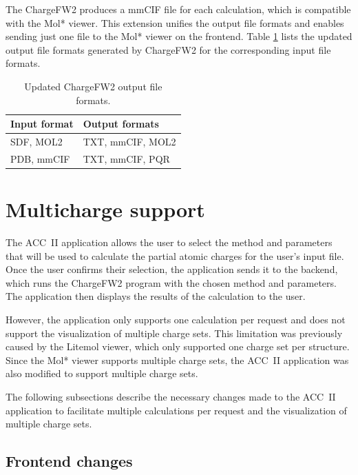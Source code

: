 \documentclass[
  digital,     %
  oneside,     %
  nosansbold,  %
  nocolorbold, %
  lof,         %
  lot,         %
]{fithesis4}
\begin{document}
The ChargeFW2 produces a mmCIF file for each calculation, which is compatible with the Mol* viewer. This extension unifies the output file formats and enables sending just one file to the Mol* viewer on the frontend. Table \ref{table:new_chargefw2_output_formats} lists the updated output file formats generated by ChargeFW2 for the corresponding input file formats.

\begin{table}[htbp]
  \centering
  \begin{tabular}{|l|l|}
    \hline
    \textbf{Input format} & \textbf{Output formats} \\
    \hline
    SDF, MOL2 & TXT, mmCIF, MOL2 \\
    \hline
    PDB, mmCIF & TXT, mmCIF, PQR \\
    \hline
  \end{tabular}
  \caption{Updated ChargeFW2 output file formats.}
  \label{table:new_chargefw2_output_formats}
\end{table}

\section{Multicharge support}
\label{section:multicharge_support}

The ACC~II application allows the user to select the method and parameters that will be used to calculate the partial atomic charges for the user's input file. Once the user confirms their selection, the application sends it to the backend, which runs the ChargeFW2 program with the chosen method and parameters. The application then displays the results of the calculation to the user.

However, the application only supports one calculation per request and does not support the visualization of multiple charge sets. This limitation was previously caused by the Litemol viewer, which only supported one charge set per structure. Since the Mol* viewer supports multiple charge sets, the ACC~II application was also modified to support multiple charge sets.

The following subsections describe the necessary changes made to the ACC~II application to facilitate multiple calculations per request and the visualization of multiple charge sets.

\subsection{Frontend changes}
\end{document}
